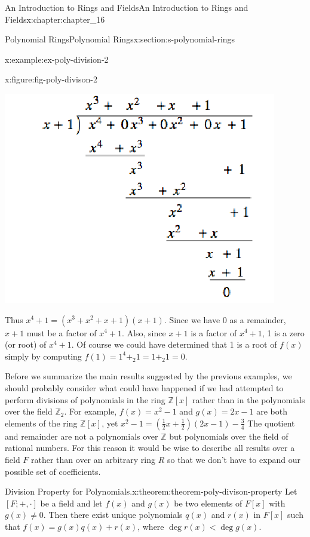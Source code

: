 \documentclass[twoside,10pt,]{book}
\numberwithin{equation}{section}
\begin{document}
\begin{chapterptx}{An Introduction to Rings and Fields}{}{An Introduction to Rings and Fields}{}{}{x:chapter:chapter_16}
\begin{sectionptx}{Polynomial Rings}{}{Polynomial Rings}{}{}{x:section:s-polynomial-rings}
\begin{example}{}{x:example:ex-poly-division-2}
\begin{figureptx}{}{x:figure:fig-poly-divison-2}{}
\begin{image}{0.225}{0.55}{0.225}
\includegraphics[width=\linewidth]{images/fig-poly-divison-2.png}
\end{image}%
\tcblower
\end{figureptx}%
Thus \(x^4+ 1 = \left(x^3+x^2+ x + 1\right)(x+1) \). Since we have 0 as a remainder, \(x + 1\) must be a factor of \(x^4+ 1\). Also, since \(x + 1\) is a factor of \(x^4 +
1\),  1 is a zero (or root) of \(x^4 + 1\).   Of course we could have determined that 1 is a root of \(f(x)\) simply by computing   \(f(1)
=1^4 +_2 1 = 1 +_2 1 = 0\).%
\end{example}
Before we summarize the main results suggested by the previous examples, we should probably consider what could have happened if we had  attempted to perform divisions of polynomials in the ring \(\mathbb{Z}[x]\) rather than in the polynomials over the field \(\mathbb{Z}_2\). For example, \(f(x) = x^2 - 1\) and \(g(x)
= 2x - 1\) are  both elements of the ring \(\mathbb{Z}[x]\), yet \(x^2-1=(\frac{1}{2} x+\frac{1}{2})(2x-1)-\frac{3}{4}\) The quotient and remainder are not a polynomials over \(\mathbb{Z}\) but polynomials over the field of rational numbers. For this reason it would be wise to describe all results over a field \(F\) rather than over an arbitrary ring \(R\) so that we don't have to expand our possible set of coefficients.%
\begin{theorem}{Division Property for Polynomials.}{}{x:theorem:theorem-poly-divison-property}%
%
Let \([F; +, \cdot ]\) be a field and let \(f(x)\) and \(g(x)\) be two elements of \(F[x]\) with \(g(x) \neq  0\). Then there exist unique polynomials \(q(x)\) and \(r(x)\) in \(F[x]\) such that \(f(x) = g(x) q(x) + r(x)\), where \(\deg  r(x) < \deg  g(x)\).%

\end{theorem}
\end{sectionptx}
\end{chapterptx}
\end{document}
